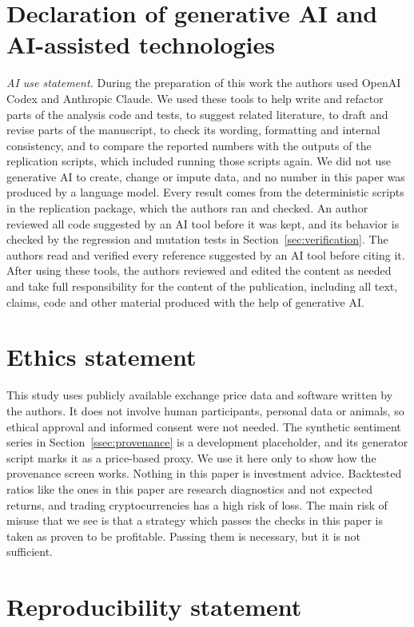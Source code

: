 \documentclass[preprint,12pt,authoryear,a4paper]{elsarticle}
\begin{document}
\section*{Declaration of generative AI and AI-assisted technologies}

\emph{AI use statement.} During the preparation of this work the authors used
OpenAI Codex and Anthropic Claude. We used these tools to help write and refactor
parts of the analysis code and tests, to suggest related literature, to draft and
revise parts of the manuscript, to check its wording, formatting and internal
consistency, and to compare the reported numbers with the outputs of the
replication scripts, which included running those scripts again. We did not use
generative AI to create, change or impute data, and no number in this paper was
produced by a language model. Every result comes from the deterministic scripts in
the replication package, which the authors ran and checked. An author reviewed all
code suggested by an AI tool before it was kept, and its behavior is checked by the
regression and mutation tests in Section~\ref{sec:verification}. The authors read
and verified every reference suggested by an AI tool before citing it. After using
these tools, the authors reviewed and edited the content as needed and take full
responsibility for the content of the publication, including all text, claims, code
and other material produced with the help of generative AI.

\section*{Ethics statement}

This study uses publicly available exchange price data and software written by the
authors. It does not involve human participants, personal data or animals, so
ethical approval and informed consent were not needed. The synthetic sentiment
series in Section~\ref{ssec:provenance} is a development placeholder, and its
generator script marks it as a price-based proxy. We use it here only to show how
the provenance screen works. Nothing in this paper is investment advice. Backtested
ratios like the ones in this paper are research diagnostics and not expected
returns, and trading cryptocurrencies has a high risk of loss. The main risk of
misuse that we see is that a strategy which passes the checks in this paper is
taken as proven to be profitable. Passing them is necessary, but it is not
sufficient.

\section*{Reproducibility statement}
\end{document}

